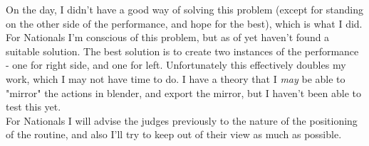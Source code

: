         	On the day, I didn't have a good way of solving this problem (except for standing on the other side of the performance, and hope for the best), which is what I did.\\
            For Nationals I'm conscious of this problem, but as of yet haven't found a suitable solution. The best solution is to create two instances of the performance - one for right side, and one for left. Unfortunately this effectively doubles my work, which I may not have time to do. I have a theory that I \textit{may} be able to "mirror" the actions in blender, and export the mirror, but I haven't been able to test this yet.\\
            
            For Nationals I will advise the judges previously to the nature of the positioning of the routine, and also I'll try to keep out of their view as much as possible.\\
            
		
            
            
        
        
